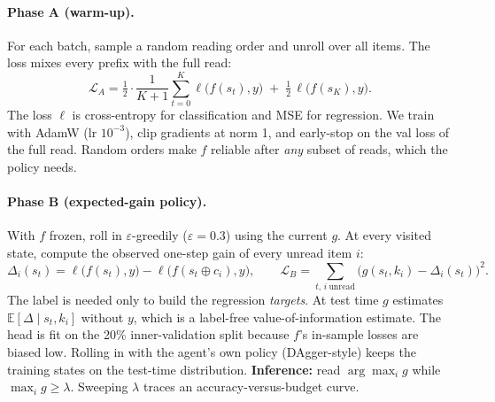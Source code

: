 \documentclass[11pt,a4paper]{article}
\begin{document}
\begin{figure}[h]
\centering
{}
\end{figure}

\paragraph{Phase A (warm-up).}
For each batch, sample a random reading order and unroll over all items.
The loss mixes every prefix with the full read:
\[
  \mathcal{L}_A=\tfrac12\cdot\frac{1}{K+1}\sum_{t=0}^{K}\ell\big(f(s_t),y\big)\;+\;\tfrac12\,\ell\big(f(s_K),y\big).
\]
The loss $\ell$ is cross-entropy for classification and MSE for regression.
We train with AdamW (lr $10^{-3}$), clip gradients at norm 1, and early-stop on the val loss of the full read.
Random orders make $f$ reliable after \emph{any} subset of reads, which the policy needs.

\paragraph{Phase B (expected-gain policy).}\label{sec:policy}
With $f$ frozen, roll in $\varepsilon$-greedily ($\varepsilon=0.3$) using the current $g$.
At every visited state, compute the observed one-step gain of every unread item $i$:
\[
  \Delta_i(s_t)=\ell\big(f(s_t),y\big)-\ell\big(f(s_t\oplus c_i),y\big),
  \qquad
  \mathcal{L}_B=\sum_{t,\,i\ \text{unread}}\big(g(s_t,k_i)-\Delta_i(s_t)\big)^2 .
\]
The label is needed only to build the regression \emph{targets}.
At test time $g$ estimates $\mathbb{E}[\Delta\mid s_t,k_i]$ without $y$, which is a label-free value-of-information estimate.
The head is fit on the 20\% inner-validation split because $f$'s in-sample losses are biased low.
Rolling in with the agent's own policy (DAgger-style) keeps the training states on the test-time distribution.
\textbf{Inference:} read $\arg\max_i g$ while $\max_i g\ge\lambda$.
Sweeping $\lambda$ traces an accuracy-versus-budget curve.
\end{document}

